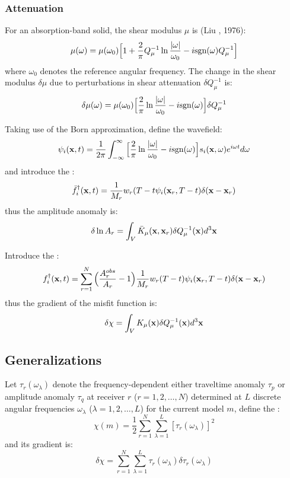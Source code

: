 \subsubsection{Attenuation}
For an absorption-band solid, the shear modulus $\mu$ is (Liu \etal, 1976):
\[ \mu(\omega)=\mu(\omega_0)\Big[1+\frac{2}{\pi}Q_\mu^{-1}\ln\frac{|\omega|}{\omega_0}-i\text{sgn}(\omega)Q_\mu^{-1}\Big] \]
where $\omega_0$ denotes the reference angular frequency. The change in the shear modulus $\delta\mu$ due to perturbations in shear attenuation $\delta Q_\mu^{-1}$ is:
\[ \delta\mu(\omega)=\mu(\omega_0)\Big[\frac{2}{\pi}\ln\frac{|\omega|}{\omega_0}-i\text{sgn}(\omega)\Big]\delta Q_\mu^{-1} \]\par
Taking use of the Born approximation, define the wavefield:
\[ \psi_i(\mathbf{x},t)=\frac{1}{2\pi}\int_{-\infty}^\infty\Big[\frac{2}{\pi}\ln\frac{|\omega|}{\omega_0}-i\text{sgn}(\omega)\Big]s_i(\mathbf{x},\omega)e^{i\omega t}d\omega \]
and introduce the :
\[ \bar f_i^\dagger(\mathbf{x},t)=\frac{1}{M_r}w_r(T-t\psi_i(\mathbf{x}_r,T-t)\delta(\mathbf{x}-\mathbf{x}_r) \]
thus the amplitude anomaly is:
\[ \delta\ln A_r=\int_V\bar K_\mu(\mathbf{x},\mathbf{x}_r)\delta Q_\mu^{-1}(\mathbf{x})d^3\mathbf{x} \]\par
Introduce the :
\[ f_i^\dagger(\mathbf{x},t)=\sum_{r=1}^N\Big(\frac{A_r^{obs}}{A_r}-1\Big)\frac{1}{M_r}w_r(T-t)\psi_i(\mathbf{x}_r,T-t)\delta(\mathbf{x}-\mathbf{x}_r) \]
thus the gradient of the  misfit function is:
\[ \delta\chi=\int_VK_\mu(\mathbf{x})\delta Q_\mu^{-1}(\mathbf{x})d^3\mathbf{x} \]\par
\subsection{Generalizations}
Let $\tau_r(\omega_\lambda)$ denote the frequency-dependent either traveltime anomaly $\tau_p$ or amplitude anomaly $\tau_q$ at receiver $r$ ($r=1,2,\ldots,N$) determined at $L$ discrete angular frequencies $\omega_\lambda$ ($\lambda=1,2,\ldots,L$) for the current model $m$, define the :
\[ \chi(m)=\frac{1}{2}\sum_{r=1}^N\sum_{\lambda=1}^L[\tau_r(\omega_\lambda)]^2 \]
and its gradient is:
\[ \delta\chi=\sum_{r=1}^N\sum_{\lambda=1}^L\tau_r(\omega_\lambda)\delta\tau_r(\omega_\lambda) \]
